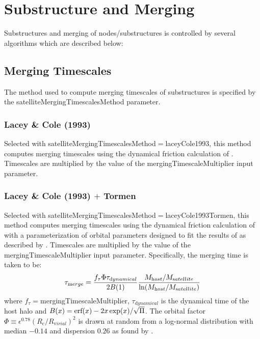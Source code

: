 \section{Substructure and Merging}

Substructures and merging of nodes/substructures is controlled by several algorithms which are described below:

\subsection{Merging Timescales}\label{sec:SatelliteMergingTimescales}

The method used to compute merging timescales of substructures is specified by the {\normalfont \ttfamily satelliteMergingTimescalesMethod} parameter.

\subsubsection{Lacey \& Cole (1993)}\label{phys:satelliteMergingTimescales:satelliteMergingTimescalesLaceyCole1993}

Selected with {\normalfont \ttfamily satelliteMergingTimescalesMethod}$=${\normalfont \ttfamily laceyCole1993}, this method computes merging timescales using the dynamical friction calculation of \cite{lacey_merger_1993}. Timescales are multiplied by the value of the {\normalfont \ttfamily mergingTimescaleMultiplier} input parameter.

\subsubsection{Lacey \& Cole (1993) $+$ Tormen}\label{phys:satelliteMergingTimescales:satelliteMergingTimescalesLaceyCole1993Tormen}

Selected with {\normalfont \ttfamily satelliteMergingTimescalesMethod}$=${\normalfont \ttfamily laceyCole1993Tormen}, this method computes merging timescales using the dynamical friction calculation of \cite{lacey_merger_1993} with a parameterization of orbital parameters designed to fit the results of \cite{tormen_rise_1997} as described by \cite{cole_hierarchical_2000}. Timescales are multiplied by the value of the {\normalfont \ttfamily mergingTimescaleMultiplier} input parameter. Specifically, the merging time is taken to be:
\begin{equation}
 \tau_{\mathrm merge} = {f_\tau \Phi \tau_{\mathrm dynamical} \over 2 B(1)} { M_{\mathrm host}/M_{\mathrm satellite} \over \ln (M_{\mathrm host}/M_{\mathrm satellite})}
\end{equation}
where $f_\tau=${\normalfont \ttfamily mergingTimescaleMultiplier}, $\tau_{\mathrm dynamical}$ is the dynamical time of the host halo and $B(x)=\hbox{erf}(x)-2 x \exp(x)/\sqrt{\Pi}$. The orbital factor $\Phi \equiv \epsilon^{0.78} (R_{\mathrm c}/R_{\mathrm virial})^2$ is drawn at random from a log-normal distribution with median $-0.14$ and dispersion $0.26$ as found by \cite{cole_hierarchical_2000}.

